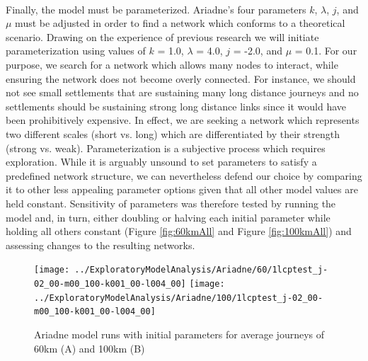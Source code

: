 \documentclass[12pt,a4paper]{thesis}
\begin{document}
\paragraph{}
Finally, the model must be parameterized. Ariadne's four parameters $k$, $\lambda$, $j$, and $\mu$ must be adjusted in order to find a network which conforms to a theoretical scenario. Drawing on the experience of previous research \citep{KnaRivEva11} we will initiate parameterization using values of $k$ = 1.0, $\lambda$ = 4.0, $j$ = -2.0, and $\mu$ = 0.1. For our purpose, we search for a network which allows many nodes to interact, while ensuring the network does not become overly connected. For instance, we should not see small settlements that are sustaining many long distance journeys and no settlements should be sustaining strong long distance links since it would have been prohibitively expensive. In effect, we are seeking a network which represents two different scales (short vs. long) which are differentiated by their strength (strong vs. weak). Parameterization is a subjective process which requires exploration. While it is arguably unsound to set parameters to satisfy a predefined network structure, we can nevertheless defend our choice by comparing it to other less appealing parameter options given that all other model values are held constant. Sensitivity of parameters was therefore tested by running the model and, in turn, either doubling or halving each initial parameter while holding all others constant (Figure \ref{fig:60kmAll} and Figure \ref{fig:100kmAll}) and assessing changes to the resulting networks.

\begin{figure}
\centering
\texttt{[image: ../ExploratoryModelAnalysis/Ariadne/60/1lcptest\_j-02\_00-m00\_100-k001\_00-l004\_00]}
\texttt{[image: ../ExploratoryModelAnalysis/Ariadne/100/1lcptest\_j-02\_00-m00\_100-k001\_00-l004\_00]}
\caption{Ariadne model runs with initial parameters for average journeys of 60km (A) and 100km (B)}
\label{fig:initParams}
\end{figure}
\end{document}
